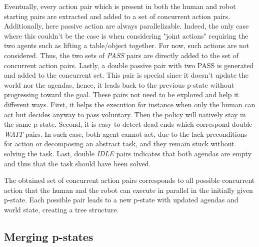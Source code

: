 Eventually, every action pair which is present in both the human and robot starting pairs are extracted and added to a set of concurrent action pairs. 
Additionally, here passive action are always parallelizable. Indeed, the only case where this couldn't be the case is when considering "joint actions" requiring the two agents such as lifting a table/object together. For now, such actions are not considered. Thus, the two sets of \textit{PASS} pairs are directly added to the set of concurrent action pairs. 
Lastly, a double passive pair with two PASS is generated and added to the concurrent set. This pair is special since it doesn't update the world nor the agendas, hence, it leads back to the previous p-state without progressing toward the goal. These pairs not need to be explored and help it different ways. First, it helps the execution for instance when only the human can act but decides anyway to pass voluntary. Then the policy will natively stay in the same p-state. Second, it is easy to detect dead-ends which correspond double \textit{WAIT} pairs. In such case, both agent cannot act, due to the lack preconditions for action or decomposing an abstract task, and they remain stuck without solving the task.  
Last, double \textit{IDLE} pairs indicates that both agendas are empty and thus that the task should have been solved. 

The obtained set of concurrent action pairs corresponds to all possible concurrent action that the human and the robot can execute in parallel in the initially given p-state. Each possible pair leads to a new p-state with updated agendas and world state, creating a tree structure. 

    \subsection{Merging p-states}

